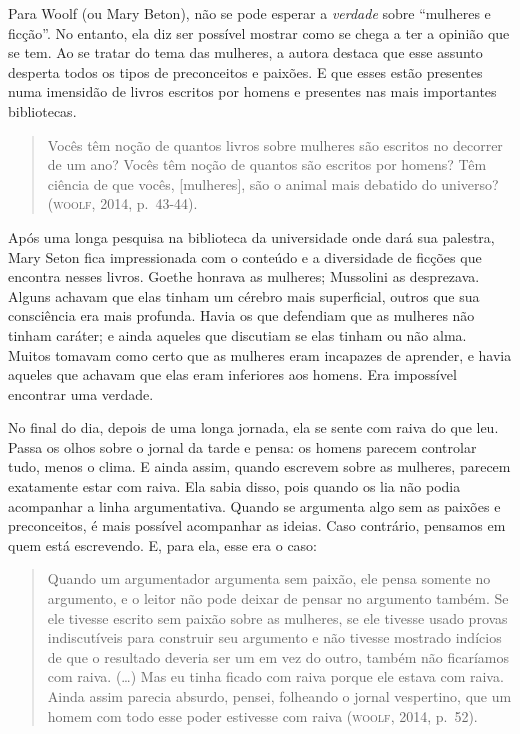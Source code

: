 Para Woolf (ou Mary Beton), não se pode esperar a \emph{verdade} sobre
``mulheres e ficção''. No entanto, ela diz ser possível mostrar como se
chega a ter a opinião que se tem. Ao se tratar do tema das mulheres, a
autora destaca que esse assunto desperta todos os tipos de preconceitos
e paixões. E que esses estão presentes numa imensidão de livros escritos
por homens e presentes nas mais importantes bibliotecas.

\begin{quote}
Vocês têm noção de quantos livros sobre mulheres são escritos no
decorrer de um ano? Vocês têm noção de quantos são escritos por homens?
Têm ciência de que vocês, {[}mulheres{]}, são o animal mais debatido do
universo? (\textsc{woolf}, 2014, p.~43-44).
\end{quote}

Após uma longa pesquisa na biblioteca da universidade onde dará sua
palestra, Mary Seton fica impressionada com o conteúdo e a diversidade
de ficções que encontra nesses livros. Goethe honrava as mulheres;
Mussolini as desprezava. Alguns achavam que elas tinham um cérebro mais
superficial, outros que sua consciência era mais profunda. Havia os que
defendiam que as mulheres não tinham caráter; e ainda aqueles que
discutiam se elas tinham ou não alma. Muitos tomavam como certo que as
mulheres eram incapazes de aprender, e havia aqueles que achavam que
elas eram inferiores aos homens. Era impossível encontrar uma verdade.

No final do dia, depois de uma longa jornada, ela se sente com raiva do
que leu. Passa os olhos sobre o jornal da tarde e pensa: os homens
parecem controlar tudo, menos o clima. E ainda assim, quando escrevem
sobre as mulheres, parecem exatamente estar com raiva. Ela sabia disso,
pois quando os lia não podia acompanhar a linha argumentativa. Quando se
argumenta algo sem as paixões e preconceitos, é mais possível acompanhar
as ideias. Caso contrário, pensamos em quem está escrevendo. E, para
ela, esse era o caso:

\begin{quote}
Quando um argumentador argumenta sem paixão, ele pensa somente no
argumento, e o leitor não pode deixar de pensar no argumento também. Se
ele tivesse escrito sem paixão sobre as mulheres, se ele tivesse usado
provas indiscutíveis para construir seu argumento e não tivesse mostrado
indícios de que o resultado deveria ser um em vez do outro, também não
ficaríamos com raiva. (\ldots{}) Mas eu tinha ficado com raiva porque ele
estava com raiva. Ainda assim parecia absurdo, pensei, folheando o
jornal vespertino, que um homem com todo esse poder estivesse com
raiva (\textsc{woolf}, 2014, p.~52).
\end{quote}

